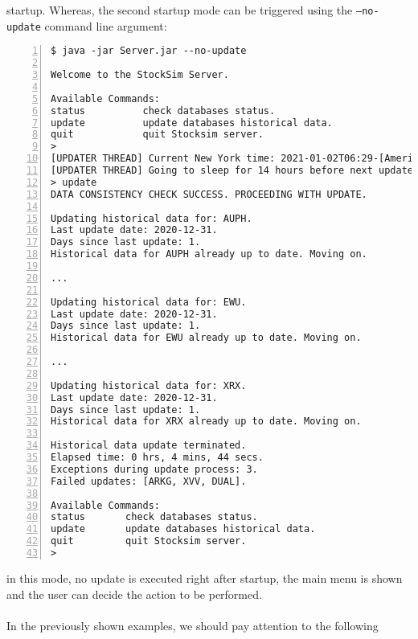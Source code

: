startup. Whereas, the second startup mode can be triggered using the
\texttt{--no-update} command line argument:
\vspace{0.2cm}
\begin{lstlisting}[basicstyle=\footnotesize\ttfamily,language={},numbers=left,keepspaces=true,tabsize=4,
numberstyle=\footnotesize,numbersep=8pt,frame=single]
$ java -jar Server.jar --no-update

Welcome to the StockSim Server.

Available Commands:
status			check databases status.
update			update databases historical data.
quit			quit Stocksim server.
> 
[UPDATER THREAD] Current New York time: 2021-01-02T06:29-[America/New_York]
[UPDATER THREAD] Going to sleep for 14 hours before next update.
> update
DATA CONSISTENCY CHECK SUCCESS. PROCEEDING WITH UPDATE.

Updating historical data for: AUPH.
Last update date: 2020-12-31.
Days since last update: 1.
Historical data for AUPH already up to date. Moving on.

...

Updating historical data for: EWU.
Last update date: 2020-12-31.
Days since last update: 1.
Historical data for EWU already up to date. Moving on.

...

Updating historical data for: XRX.
Last update date: 2020-12-31.
Days since last update: 1.
Historical data for XRX already up to date. Moving on.

Historical data update terminated.
Elapsed time: 0 hrs, 4 mins, 44 secs.
Exceptions during update process: 3.
Failed updates: [ARKG, XVV, DUAL].

Available Commands:
status       check databases status.
update       update databases historical data.
quit         quit Stocksim server.
> 
\end{lstlisting}
\vspace{-0.5cm}
in this mode, no update is executed right after startup, the main menu is shown
and the user can decide the action to be performed.\\
\\
In the previously shown examples, we should pay attention to the following
